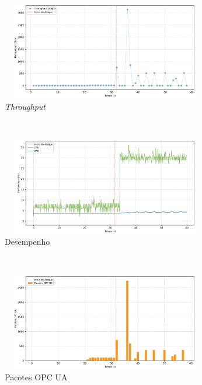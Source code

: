 \begin{apendicesenv}
\begin{figure}[htbp!]
    \centering
    \caption{\label{fig:0-dos_function_call_null_deref}Gráficos do ataque de DoS por desreferenciação de ponteiro nulo - nível de segurança: `None'.}
    \begin{subfigure}[t]{0.5\textwidth}
        \centering
        \caption{\textit{Throughput}}
        \includegraphics[width=1\textwidth, height=120pt]{USPSC-img/output/cropped/0-dos_function_call_null_deref-tput.png}
    \end{subfigure}%
    ~ 
    \begin{subfigure}[t]{0.5\textwidth}
        \centering
        \caption{Desempenho}
        \includegraphics[width=1\textwidth, height=120pt]{USPSC-img/output/cropped/0-dos_function_call_null_deref-perf.png}
    \end{subfigure}%
    \\
    \begin{subfigure}[t]{0.5\textwidth}
        \centering
        \caption{Pacotes OPC UA}
        \includegraphics[width=1\textwidth, height=120pt]{USPSC-img/output/cropped/0-dos_function_call_null_deref-pack.png}
    \end{subfigure}%
    ~
    \begin{subfigure}[t]{0.5\textwidth}

\end{subfigure}
\end{figure}
\end{apendicesenv}
